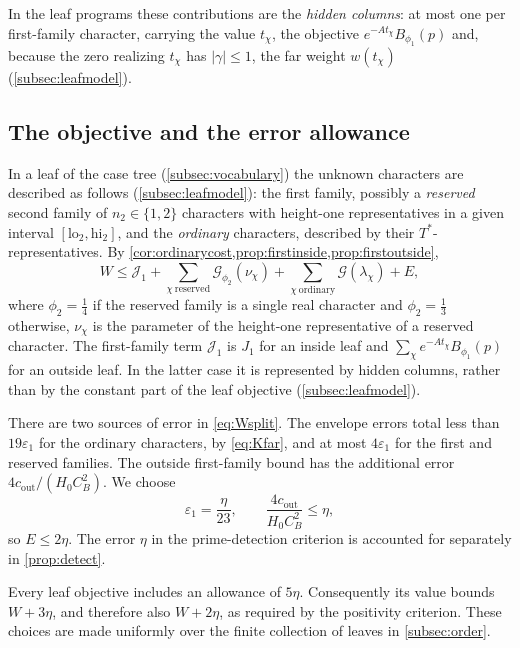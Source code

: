 \documentclass[11pt]{amsart}
\numberwithin{equation}{section}
\theoremstyle{plain}
\theoremstyle{definition}
\theoremstyle{remark}
\newcommand{\eps}{\varepsilon}
\newcommand{\lo}{\mathrm{lo}}
\newcommand{\hi}{\mathrm{hi}}
\newcommand{\1}{\mathbf{1}}
\begin{document}
In the leaf programs these contributions are the \emph{hidden columns}: at most one per
first-family character, carrying the value $t_\chi$, the objective $e^{-At_\chi}B_{\phi_1}(p)$ and,
because the zero realizing $t_\chi$ has $|\gamma|\le1$, the far weight $w(t_\chi)$
(\cref{subsec:leafmodel}).

\subsection{The objective and the error allowance}\label{subsec:allowance}
In a leaf of the case tree (\cref{subsec:vocabulary}) the unknown characters are described as follows (\cref{subsec:leafmodel}): the
first family, possibly a \emph{reserved} second family of $n_2\in\{1,2\}$ characters with
height-one representatives in a given interval $[\lo_2,\hi_2]$, and the \emph{ordinary}
characters, described by their $T^*$-representatives. By
\cref{cor:ordinarycost,prop:firstinside,prop:firstoutside},
\begin{equation}\label{eq:Wsplit}
  W\le\mathcal J_1+\sum_{\chi\ \mathrm{reserved}}\mathcal G_{\phi_2}(\nu_\chi)
  +\sum_{\chi\ \mathrm{ordinary}}\mathcal G(\lambda_\chi)+E,
\end{equation}
where $\phi_2=\frac14$ if the reserved family is a single real character and $\phi_2=\frac13$
otherwise, $\nu_\chi$ is the parameter of the height-one representative of a reserved
character. The first-family term $\mathcal J_1$ is $J_1$ for an inside leaf and
$\sum_\chi e^{-At_\chi}B_{\phi_1}(p)$ for an outside leaf. In the latter case it is
represented by hidden columns, rather than by the constant part of the leaf objective
(\cref{subsec:leafmodel}).

There are two sources of error in \eqref{eq:Wsplit}. The envelope errors total less
than $19\eps_1$ for the ordinary characters, by \eqref{eq:Kfar}, and at most
$4\eps_1$ for the first and reserved families. The outside first-family bound has the
additional error $4c_{\mathrm{out}}/(H_0C_B^2)$. We choose
\[
  \eps_1=\frac\eta{23},\qquad
  \frac{4c_{\mathrm{out}}}{H_0C_B^2}\le\eta,
\]
so $E\le2\eta$. The error $\eta$ in the prime-detection criterion is accounted for
separately in \cref{prop:detect}.

Every leaf objective includes an allowance of $5\eta$. Consequently its value bounds
$W+3\eta$, and therefore also $W+2\eta$, as required by the positivity criterion.
These choices are made uniformly over the finite collection of leaves in
\cref{subsec:order}.
\end{document}
